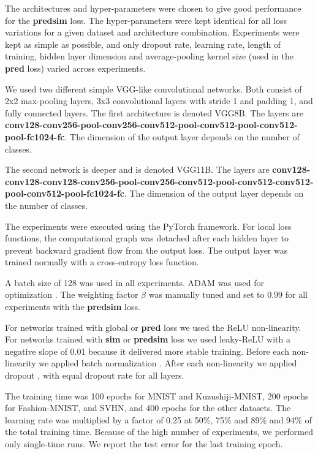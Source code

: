 \documentclass{article}
\begin{document}
The architectures and hyper-parameters were chosen to give good performance for the \textbf{predsim} loss. The hyper-parameters were kept identical for all loss variations for a given dataset and architecture combination. Experiments were kept as simple as possible, and only dropout rate, learning rate, length of training, hidden layer dimension and average-pooling kernel size (used in the \textbf{pred} loss) varied across experiments.

We used two different simple VGG-like convolutional networks. Both consist of 2x2 max-pooling layers, 3x3 convolutional layers with stride 1 and padding 1, and fully connected layers. The first architecture is denoted VGG8B. The layers are \textbf{conv128-conv256-pool-conv256-conv512-pool-conv512-pool-conv512-pool-fc1024-fc}. The dimension of the output layer depends on the number of classes. 

The second network is deeper and is denoted VGG11B. The layers are \textbf{conv128-conv128-conv128-conv256-pool-conv256-conv512-pool-conv512-conv512-pool-conv512-pool-fc1024-fc}. The dimension of the output layer depends on the number of classes.

The experiments were executed using the PyTorch framework. For local loss functions, the computational graph was detached after each hidden layer to prevent backward gradient flow from the output loss. The output layer was trained normally with a cross-entropy loss function. 

A batch size of 128 was used in all experiments. ADAM was used for optimization \cite{KingmaB14}. The weighting factor $\beta$ was manually tuned and set to $0.99$ for all experiments with the \textbf{predsim} loss.

For networks trained with global or \textbf{pred} loss we used the ReLU non-linearity. For networks trained with \textbf{sim} or \textbf{predsim} loss we used leaky-ReLU with a negative slope of 0.01 \cite{Maas13} because it delivered more stable training.  Before each non-linearity we applied batch normalization \cite{IoffeS15}. After each non-linearity we applied dropout \cite{SrivastavaHKSS14}, with equal dropout rate for all layers.

The training time was 100 epochs for MNIST and Kuzushiji-MNIST, 200 epochs for Fashion-MNIST, and SVHN, and 400 epochs for the other datasets. The learning rate was multiplied by a factor of 0.25 at 50\%, 75\% and 89\% and 94\% of the total training time. Because of the high number of experiments, we performed only single-time runs. We report the test error for the last training epoch.
\end{document}
